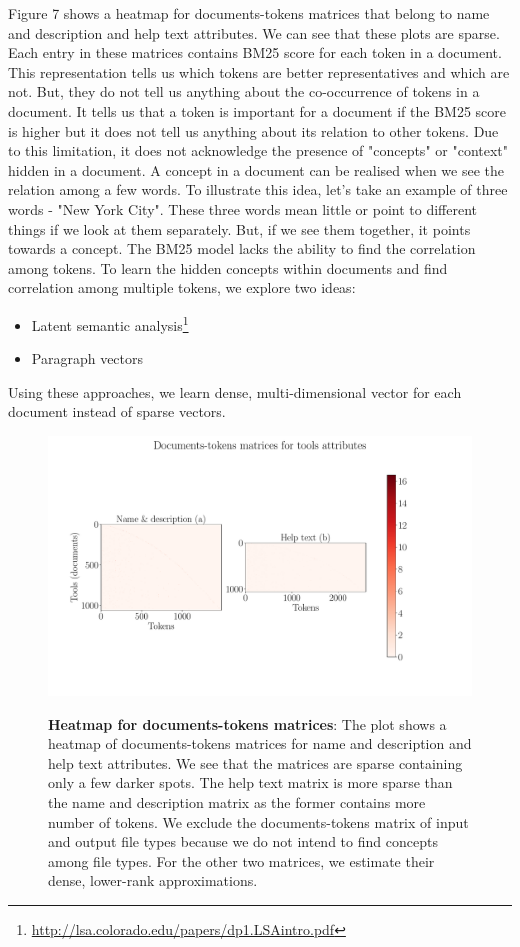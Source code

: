 Figure 7 shows a heatmap for documents-tokens matrices that belong to name and description and help text attributes. We can see that these plots are sparse. Each entry in these matrices contains BM25 score for each token in a document. This representation tells us which tokens are better representatives and which are not. But, they do not tell us anything about the co-occurrence of tokens in a document. It tells us that a token is important for a document if the BM25 score is higher but it does not tell us anything about its relation to other tokens. Due to this limitation, it does not acknowledge the presence of "concepts" or "context" hidden in a document. A concept in a document can be realised when we see the relation among a few words. To illustrate this idea, let's take an example of three words - "New York City". These three words mean little or point to different things if we look at them separately. But, if we see them together, it points towards a concept. The BM25 model lacks the ability to find the correlation among tokens. To learn the hidden concepts within documents and find correlation among multiple tokens, we explore two ideas:
\begin{itemize}
\item Latent semantic analysis\footnote{\url{http://lsa.colorado.edu/papers/dp1.LSAintro.pdf}}
\item Paragraph vectors
\end{itemize}

Using these approaches, we learn dense, multi-dimensional vector for each document instead of sparse vectors. 

\begin{figure}[h]
\begin{centering}
    {\includegraphics[scale=0.4]{figures/Document_tokens_full_rank.pdf}}
    \caption[Heatmap for documents-tokens matrices]{\textbf{Heatmap for documents-tokens matrices}: The plot shows a heatmap of documents-tokens matrices for name and description and help text attributes. We see that the matrices are sparse containing only a few darker spots. The help text matrix is more sparse than the name and description matrix as the former contains more number of tokens. We exclude the documents-tokens matrix of input and output file types because we do not intend to find concepts among file types. For the other two matrices, we estimate their dense, lower-rank approximations.}
\end{centering}
\end{figure}

